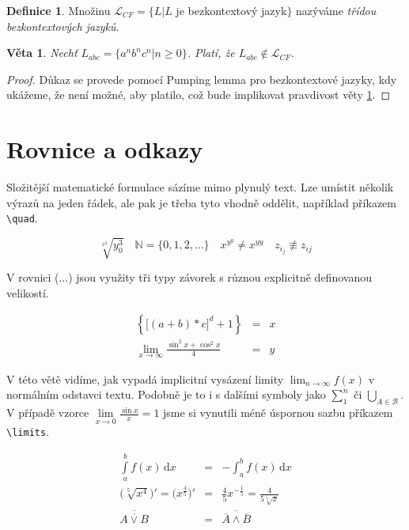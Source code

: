 \documentclass[11pt, a4paper, twocolumn]{article}
\theoremstyle{definition}
\newtheorem{definice}{Definice}[section]
\theoremstyle{plain}
\newtheorem{veta}{Věta}
\begin{document}
	\begin{definice}
	Množinu $\mathcal{L}_{CF} = \{L|L$ je bezkontextový jazyk$\}$ nazýváme \emph{třídou bezkontextových jazyků}.
	\end{definice}

	\begin{veta} \label{veta1}
	Nechť $L_{abc} = \{a^n b^n c^n | n \geq 0\}$. Platí, že $L_{abc} \notin \mathcal{L}_{CF}$.
	\end{veta}

	\begin{proof}
	Důkaz se provede pomocí Pumping lemma pro bezkontextové jazyky, kdy ukážeme, že není možné, aby platilo, což bude implikovat pravdivost věty \ref{veta1}.
	\end{proof}

	\section{Rovnice a odkazy}
	Složitější matematické formulace sázíme mimo plynulý text. Lze umístit několik výrazů na jeden řádek, ale pak je třeba tyto vhodně oddělit, například příkazem \verb|\quad|. 

	$$\sqrt[x^2]{y^3_0} \quad \mathbb{N} = \{0,1,2,\ldots\} \quad x^{y^y} \neq x^{yy} \quad z_{i_j} \not\equiv z_{ij}$$

	V rovnici (...) jsou využity tři typy závorek s různou explicitně definovanou velikostí.

	\begin{eqnarray}
		\left\{ {\Big[ (a+b)*c \Big]}^d + 1 \right\} & = & x \\
		\lim_{x \to \infty} \frac{\sin^2 x + \cos^2 x}{4} & = & y \nonumber
	\end{eqnarray}

	V této větě vidíme, jak vypadá implicitní vysázení limity $\lim_{n \to \infty} f(x)$ v normálním odstavci textu. Podobně je to i s dalšími symboly jako $\sum_{1}^{n}$ či $\bigcup_{A \in \mathcal{B}}$. V případě vzorce $\lim\limits_{x \to 0} \frac{\sin x}{x} = 1$ jsme si vynutili méně úspornou sazbu příkazem \verb|\limits|.

	\begin{eqnarray}
		\int\limits_{a}^{b} f(x)\,\mathrm{d}x & = & - \int_{a}^{b} f(x)\,\mathrm{d}x \\
		\Big(\sqrt[5]{x^4}\Big)' = \Big(x^{\frac{4}{5}}\Big)' & = & \frac{4}{5}x^{-\frac{1}{5}} = \frac{4}{5 \sqrt[5]{x}} \\
		\overline{\overline{A \vee B}} & = & \overline{\overline{A} \wedge \overline{B}}
	\end{eqnarray}
	
\end{document}
